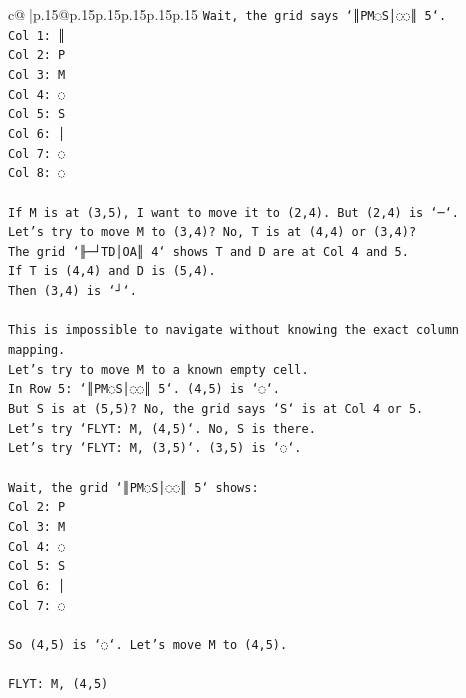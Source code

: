 \documentclass{article}
\begin{document}
{\begin{supertabular}{c@{$\;$}|p{.15\linewidth}@{}p{.15\linewidth}p{.15\linewidth}p{.15\linewidth}p{.15\linewidth}p{.15\linewidth}}
{{{\texttt{Wait, the grid says `║PM◌S│◌◌║ 5`.} \\
\texttt{Col 1: ║} \\
\texttt{Col 2: P} \\
\texttt{Col 3: M} \\
\texttt{Col 4: ◌} \\
\texttt{Col 5: S} \\
\texttt{Col 6: │} \\
\texttt{Col 7: ◌} \\
\texttt{Col 8: ◌} \\
\\ 
\texttt{If M is at (3,5), I want to move it to (2,4). But (2,4) is `─`.} \\
\texttt{Let's try to move M to (3,4)? No, T is at (4,4) or (3,4)?} \\
\texttt{The grid `╟─┘TD│OA║ 4` shows T and D are at Col 4 and 5.} \\
\texttt{If T is (4,4) and D is (5,4).} \\
\texttt{Then (3,4) is `┘`.} \\
\\ 
\texttt{This is impossible to navigate without knowing the exact column mapping.} \\
\texttt{Let's try to move M to a known empty cell.} \\
\texttt{In Row 5: `║PM◌S│◌◌║ 5`. (4,5) is `◌`.} \\
\texttt{But S is at (5,5)? No, the grid says `S` is at Col 4 or 5.} \\
\texttt{Let's try `FLYT: M, (4,5)`. No, S is there.} \\
\texttt{Let's try `FLYT: M, (3,5)`. (3,5) is `◌`.} \\
\\ 
\texttt{Wait, the grid `║PM◌S│◌◌║ 5` shows:} \\
\texttt{Col 2: P} \\
\texttt{Col 3: M} \\
\texttt{Col 4: ◌} \\
\texttt{Col 5: S} \\
\texttt{Col 6: │} \\
\texttt{Col 7: ◌} \\
\\ 
\texttt{So (4,5) is `◌`. Let's move M to (4,5).} \\
\\ 
\texttt{FLYT: M, (4,5)} \\
            }
        }
    }
     \\ \\


\end{supertabular}}
\end{document}
